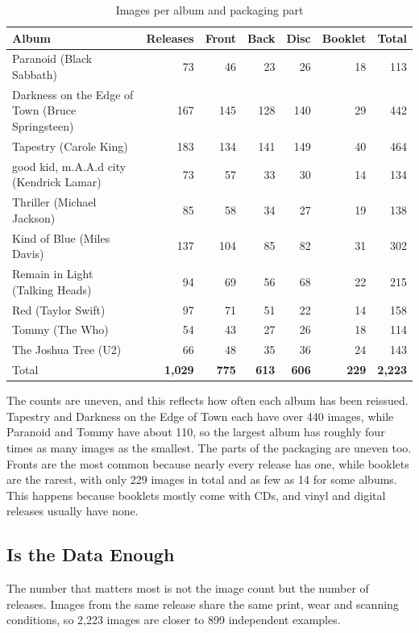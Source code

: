 \documentclass[11pt,a4paper]{article}
\begin{document}
\begin{table}[H]\centering\small\caption{Images per album and packaging part}\label{tab:counts}
\begin{tabularx}{\linewidth}{@{}Xrrrrrr@{}}\toprule
Album & Releases & Front & Back & Disc & Booklet & Total\\\midrule
Paranoid (Black Sabbath) & 73 & 46 & 23 & 26 & 18 & 113\\
Darkness on the Edge of Town (Bruce Springsteen) & 167 & 145 & 128 & 140 & 29 & 442\\
Tapestry (Carole King) & 183 & 134 & 141 & 149 & 40 & 464\\
good kid, m.A.A.d city (Kendrick Lamar) & 73 & 57 & 33 & 30 & 14 & 134\\
Thriller (Michael Jackson) & 85 & 58 & 34 & 27 & 19 & 138\\
Kind of Blue (Miles Davis) & 137 & 104 & 85 & 82 & 31 & 302\\
Remain in Light (Talking Heads) & 94 & 69 & 56 & 68 & 22 & 215\\
Red (Taylor Swift) & 97 & 71 & 51 & 22 & 14 & 158\\
Tommy (The Who) & 54 & 43 & 27 & 26 & 18 & 114\\
The Joshua Tree (U2) & 66 & 48 & 35 & 36 & 24 & 143\\\midrule
Total & \textbf{1,029} & \textbf{775} & \textbf{613} & \textbf{606} & \textbf{229} & \textbf{2,223}\\
\bottomrule\end{tabularx}\end{table}

The counts are uneven, and this reflects how often each album has been reissued. Tapestry and Darkness on the Edge of Town each have over 440 images, while Paranoid and Tommy have about 110, so the largest album has roughly four times as many images as the smallest. The parts of the packaging are uneven too. Fronts are the most common because nearly every release has one, while booklets are the rarest, with only 229 images in total and as few as 14 for some albums. This happens because booklets mostly come with CDs, and vinyl and digital releases usually have none.

\subsection{Is the Data Enough}\label{sec:enough}
The number that matters most is not the image count but the number of releases. Images from the same release share the same print, wear and scanning conditions, so 2,223 images are closer to 899 independent examples.
\end{document}
